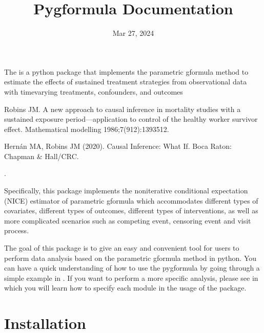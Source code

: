 \documentclass[letterpaper,10pt,english]{sphinxmanual}
\title{Pygformula Documentation}
\date{Mar 27, 2024}
\author{}
\begin{document}
\pagestyle{empty}
\sphinxmaketitle
\pagestyle{plain}
\sphinxtableofcontents
\pagestyle{normal}
\label{\detokenize{index::doc}}


\sphinxAtStartPar
The  is a python package that implements the parametric g\sphinxhyphen{}formula method
to estimate the effects of sustained treatment strategies from observational data with time\sphinxhyphen{}varying treatments, confounders, and outcomes \sphinxstepexplicit %
\begin{footnote}[1]\label{\thesphinxscope.1}%
\sphinxAtStartFootnote
Robins JM. A new approach to causal inference in mortality studies with a sustained exposure period—application to control of the healthy worker survivor effect. Mathematical modelling 1986;7(9\sphinxhyphen{}12):1393\sphinxhyphen{}512.
%
\end{footnote} \sphinxstepexplicit %
\begin{footnote}[2]\label{\thesphinxscope.2}%
\sphinxAtStartFootnote
Hernán MA, Robins JM (2020). Causal Inference: What If. Boca Raton: Chapman \& Hall/CRC.
%
\end{footnote}.

\sphinxAtStartPar
Specifically, this package implements the noniterative conditional expectation (NICE) estimator of parametric
g\sphinxhyphen{}formula which accommodates different types of covariates, different types of outcomes, different types of interventions, as well as more complicated scenarios
such as competing event, censoring event and visit process.

\sphinxAtStartPar
The goal of this package is to give an easy and convenient tool for users to perform data analysis based on the parametric g\sphinxhyphen{}formula method in python.
You can have a quick understanding of how to use the pygformula by going through a simple example in
{\hyperref[\detokenize{Get Started::doc}]{}}.
If you want to perform a more specific analysis, please see {\hyperref[\detokenize{Specifications/index::doc}]{}} in which you
will learn how to specify each module in the usage of the package.


\chapter{Installation}
\label{\detokenize{Installation:installation}}\label{\detokenize{Installation::doc}}
\end{document}
